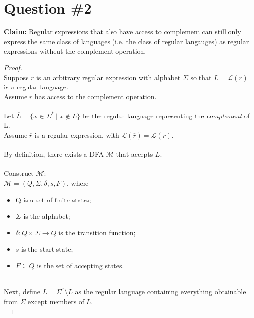 \documentclass[12pt]{article}
\begin{document}
\section*{Question \#2}
\textbf{\underline{Claim:}} Regular expressions that also have access to complement can still only express the same class of languages (i.e. the class of regular langauges) as regular expressions without the complement operation.
\begin{proof}
\leavevmode\\
    Suppose $r$ is an arbitrary regular expression with alphabet $\Sigma$ so that $L = \mathcal{L}(r)$ is a regular language. \\
    Assume $r$ has access to the complement operation. \\
    \\
    Let $\overline{L} = \{ x \in \Sigma^* \mid x \notin L \}$ be the regular language representing the \textit{complement} of L. \\
    Assume $\overline{r}$ is a regular expression, with $\mathcal{L}(\overline{r}) = \overline{\mathcal{L}(r)}$. \\
    \\
    By definition, there exists a DFA $\mathcal{M}$ that accepts $L$. \\
    \\
    Construct $\mathcal{M}$: \\
    \(\mathcal{M} = (Q, \Sigma, \delta, s, F)\), where
    \begin{itemize}
        \item Q is a set of finite states;
        \item $\Sigma$ is the alphabet;
        \item $\delta : Q \times \Sigma \to Q$ is the transition function;
        \item $s$ is the start state;
        \item $F \subseteq Q$ is the set of accepting states.
    \end{itemize}
    \leavevmode\\
    Next, define $\overline{L} = \Sigma^* \setminus L$ as the regular language containing everything obtainable from $\Sigma$ except members of $L$. \\

\end{proof}
\end{document}
